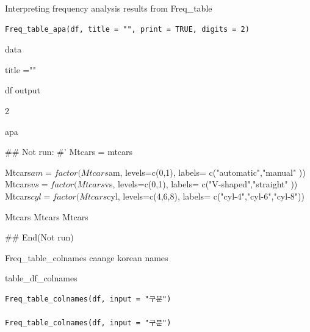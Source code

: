 \documentclass[a4paper]{book}
\begin{document}
%
\begin{Description}
Interpreting frequency analysis results from Freq\_table
\end{Description}
%
\begin{Usage}
\begin{verbatim}
Freq_table_apa(df, title = "", print = TRUE, digits = 2)
\end{verbatim}
\end{Usage}
%
\begin{Arguments}
\begin{ldescription}
\item[\code{df}] data

\item[\code{title}] title =""

\item[\code{print}] df output

\item[\code{digits}] 2
\end{ldescription}
\end{Arguments}
%
\begin{Value}
apa
\end{Value}
%
\begin{Examples}
\begin{ExampleCode}

\#\# Not run: 
#'
Mtcars = mtcars

Mtcars$am = factor(Mtcars$am, levels=c(0,1), labels= c("automatic","manual" ))
Mtcars$vs  = factor(Mtcars$vs, levels=c(0,1), labels= c("V-shaped","straight" ))
Mtcars$cyl  = factor(Mtcars$cyl, levels=c(4,6,8), labels= c("cyl-4","cyl-6","cyl-8"))

Mtcars %
Mtcars %
Mtcars %

## End(Not run)

\end{ExampleCode}
\end{Examples}
%
\begin{Description}
Freq\_table\_colnames caange korean names

table\_df\_colnames
\end{Description}
%
\begin{Usage}
\begin{verbatim}
Freq_table_colnames(df, input = "구분")

Freq_table_colnames(df, input = "구분")
\end{verbatim}
\end{Usage}
\end{document}
